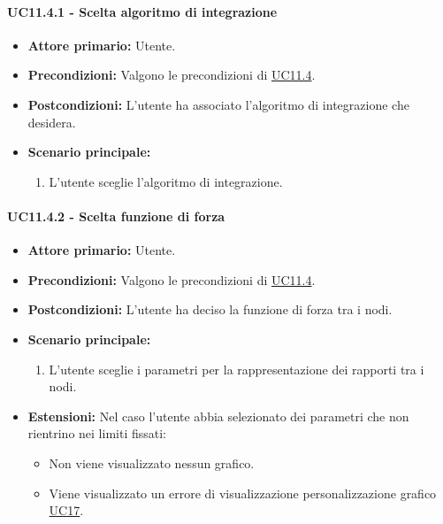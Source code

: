 \paragraph{UC11.4.1 - Scelta algoritmo di integrazione}
\label{sec:UC11.4.1}
    \begin{itemize}
        \item \textbf{Attore primario:} Utente.
        \item \textbf{Precondizioni:} Valgono le precondizioni di \hyperref[sec:UC11.4]{UC11.4}.
	    \item \textbf{Postcondizioni:} L'utente ha associato l'algoritmo di integrazione che desidera.
	    \item \textbf{Scenario principale:} 
	    \begin{enumerate}
	    		\item L'utente sceglie l'algoritmo di integrazione.
		\end{enumerate}
    \end{itemize}
    
\paragraph{UC11.4.2 - Scelta funzione di forza}
\label{sec:UC11.4.2}
    \begin{itemize}
        \item \textbf{Attore primario:} Utente.
        \item \textbf{Precondizioni:} Valgono le precondizioni di \hyperref[sec:UC11.4]{UC11.4}.
	    \item \textbf{Postcondizioni:} L'utente ha deciso la funzione di forza tra i nodi.
	    \item \textbf{Scenario principale:} 
	    \begin{enumerate}
	    		\item L'utente sceglie i parametri per la rappresentazione dei rapporti tra i nodi.
		\end{enumerate}
	    \item \textbf{Estensioni:} Nel caso l'utente abbia selezionato dei parametri che non rientrino nei limiti fissati:
              \begin{itemize}
                  \item Non viene visualizzato nessun grafico.
                  \item Viene visualizzato un errore di visualizzazione personalizzazione grafico \hyperref[sec:UC17 - Errore di personalizzazione]{UC17}.
              \end{itemize}
    \end{itemize}


